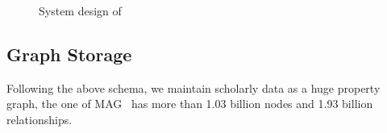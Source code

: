 \begin{figure}
\centering
{}
\vspace{-2ex}
\caption{System design of \oursystem  }
\label{fig:system}
\vspace{-2ex}
\end{figure}


\subsection{Graph Storage} \label{subsec:storage}


Following the above schema, we maintain scholarly data as a huge property graph, \eg the one of MAG~\cite{sinha2015overview}  has more than 1.03 billion nodes and 1.93 billion relationships. %


